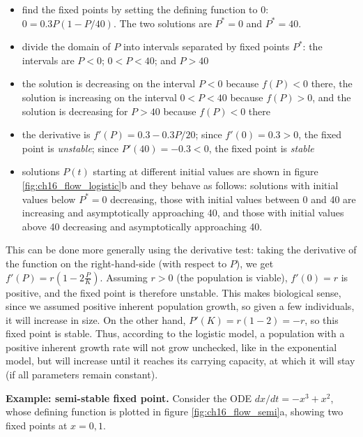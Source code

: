 \documentclass[
  letterpaper,
  DIV=11,
  numbers=noendperiod]{scrreprt}
\begin{document}
\begin{itemize}
\item
  find the fixed points by setting the defining function to 0:
  \(0 = 0.3P(1-P/40)\). The two solutions are \(P^*=0\) and \(P^*=40\).
\item
  divide the domain of \(P\) into intervals separated by fixed points
  \(P^*\): the intervals are \(P<0\); \(0<P<40\); and \(P>40\)
\item
  the solution is decreasing on the interval \(P<0\) because \(f(P)<0\)
  there, the solution is increasing on the interval \(0<P<40\) because
  \(f(P)>0\), and the solution is decreasing for \(P>40\) because
  \(f(P)<0\) there
\item
  the derivative is \(f'(P)=0.3-0.3P/20\); since \(f'(0)=0.3 > 0\), the
  fixed point is \emph{unstable}; since \(P'(40)=-0.3<0\), the fixed
  point is \emph{stable}
\item
  solutions \(P(t)\) starting at different initial values are shown in
  figure \ref{fig:ch16_flow_logistic}b and they behave as follows:
  solutions with initial values below \(P^*=0\) decreasing, those with
  initial values between 0 and 40 are increasing and asymptotically
  approaching 40, and those with initial values above 40 decreasing and
  asymptotically approaching 40.
\end{itemize}

This can be done more generally using the derivative test: taking the
derivative of the function on the right-hand-side (with respect to
\(P\)), we get \(f'(P) = r(1-2\frac{P}{K})\). Assuming \(r>0\) (the
population is viable), \(f'(0)= r\) is positive, and the fixed point is
therefore unstable. This makes biological sense, since we assumed
positive inherent population growth, so given a few individuals, it will
increase in size. On the other hand, \(P'(K) = r(1-2) = -r\), so this
fixed point is stable. Thus, according to the logistic model, a
population with a positive inherent growth rate will not grow unchecked,
like in the exponential model, but will increase until it reaches its
carrying capacity, at which it will stay (if all parameters remain
constant).

\textbf{Example: semi-stable fixed point.} Consider the ODE
\(dx/dt = -x^3 + x^2\), whose defining function is plotted in figure
\ref{fig:ch16_flow_semi}a, showing two fixed points at \(x = 0, 1\).
\end{document}
